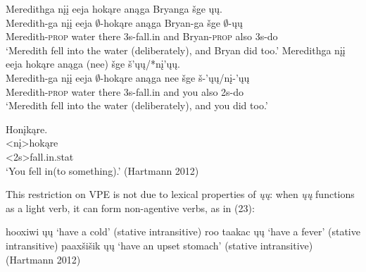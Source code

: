 \documentclass[output=paper]{LSP/langsci}
\begin{document}
\begin{exe}
\ex
\begin{xlist}
\ex
\glll Meredithga n\k{i}\k{i} eeja hok\k{a}re an\k{a}ga Bryanga \v{s}ge \k{u}\k{u}.\\
Meredith-ga n\k{i}\k{i} eeja $\emptyset$-hok\k{a}re an\k{a}ga Bryan-ga \v{s}ge $\emptyset$-\k{u}\k{u}\\
Meredith-\textsc{prop} water there {\textsc 3s}-fall.in and Bryan-\textsc{prop} also {\textsc 3s}-do\\
\trans `Meredith fell into the water (deliberately), and Bryan did too.'
\ex
\glll Meredithga n\k{i}\k{i} eeja hok\k{a}re an\k{a}ga (nee) \v{s}ge \v{s}'\k{u}\k{u}/*n\k{i}'\k{u}\k{u}.\\
Meredith-ga n\k{i}\k{i} eeja $\emptyset$-hok\k{a}re an\k{a}ga nee \v{s}ge \v{s}-'\k{u}\k{u}/n\k{i}-'\k{u}\k{u}\\
Meredith-\textsc{prop} water there {\textsc 3s}-fall.in and you also {\textsc 2s}-do\\
\trans `Meredith fell into the water (deliberately), and you did too.'
\end{xlist}
\end{exe}

\begin{exe}
\ex
\glll Hon\k{i}k\k{a}re.\\
<n\k{i}>hok\k{a}re\\
<{\textsc 2s}>fall.in.{\textsc stat}\\
\trans `You fell in(to something).' (Hartmann 2012)
\end{exe}
	
This restriction on VPE is not due to lexical properties of \emph{\k{u}\k{u}}: when \emph{\k{u}\k{u}} functions as a light verb, it can form non-agentive verbs, as in (23):


\begin{singlespacing}
\begin{exe}
\ex
\begin{xlist}
\ex
hooxiwi \k{u}\k{u} `have a cold' (stative intransitive)
\vspace{12pt}
\ex
roo taakac \k{u}\k{u} `have a fever' (stative intransitive)
\vspace{12pt}
\ex
paax\v{s}i\v{s}ik \k{u}\k{u} `have an upset stomach' (stative intransitive)\\
(Hartmann 2012)
\end{xlist}
\end{exe}
\end{singlespacing}
\end{document}
